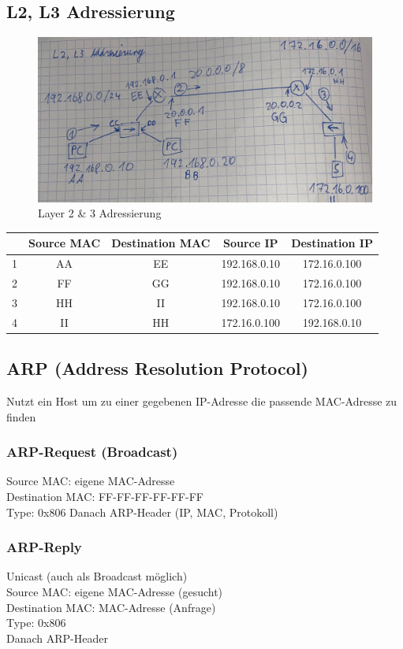 \subsection*{L2, L3 Adressierung}
\begin{figure}[H]
	\centering
	\includegraphics[width=1.0\linewidth]{figures/l2l3add.jpeg}
	\caption{Layer 2 \& 3 Adressierung}
\end{figure}

\begin{table}[H]
	\begin{tabular}{c|cccc}
		& Source MAC & Destination MAC & Source IP & Destination IP \\
		\hline
		1 & AA & EE & 192.168.0.10 & 172.16.0.100 \\
		2 & FF & GG & 192.168.0.10 & 172.16.0.100 \\
		3 & HH & II & 192.168.0.10 & 172.16.0.100 \\
		4 & II & HH & 172.16.0.100 & 192.168.0.10
	\end{tabular}
\end{table}

\subsection*{ARP (Address Resolution Protocol)}
Nutzt ein Host um zu einer gegebenen IP-Adresse die passende MAC-Adresse zu finden

\subsubsection*{ARP-Request (Broadcast)}
Source MAC: eigene MAC-Adresse \\
Destination MAC: FF-FF-FF-FF-FF-FF \\
Type: 0x806
Danach ARP-Header (IP, MAC, Protokoll)

\subsubsection*{ARP-Reply}
Unicast (auch als Broadcast möglich) \\
Source MAC: eigene MAC-Adresse (gesucht) \\
Destination MAC: MAC-Adresse (Anfrage) \\
Type: 0x806 \\
Danach ARP-Header

